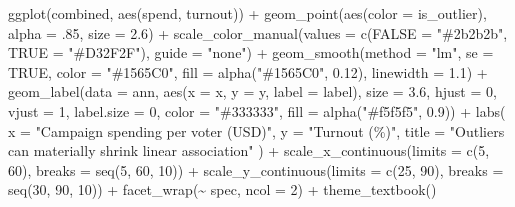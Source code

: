 \documentclass[
  letterpaper,
  DIV=11,
  numbers=noendperiod]{scrreprt}
\newenvironment{Shaded}{\begin{snugshade}}{\end{snugshade}}
\newcommand{\AttributeTok}[1]{\textcolor[rgb]{0.40,0.45,0.13}{#1}}
\newcommand{\ConstantTok}[1]{\textcolor[rgb]{0.56,0.35,0.01}{#1}}
\newcommand{\DecValTok}[1]{\textcolor[rgb]{0.68,0.00,0.00}{#1}}
\newcommand{\FloatTok}[1]{\textcolor[rgb]{0.68,0.00,0.00}{#1}}
\newcommand{\FunctionTok}[1]{\textcolor[rgb]{0.28,0.35,0.67}{#1}}
\newcommand{\NormalTok}[1]{\textcolor[rgb]{0.00,0.23,0.31}{#1}}
\newcommand{\OtherTok}[1]{\textcolor[rgb]{0.00,0.23,0.31}{#1}}
\newcommand{\SpecialCharTok}[1]{\textcolor[rgb]{0.37,0.37,0.37}{#1}}
\newcommand{\StringTok}[1]{\textcolor[rgb]{0.13,0.47,0.30}{#1}}
\begin{document}
\begin{Shaded}
\begin{Highlighting}[]
\FunctionTok{ggplot}\NormalTok{(combined, }\FunctionTok{aes}\NormalTok{(spend, turnout)) }\SpecialCharTok{+}
  \FunctionTok{geom\_point}\NormalTok{(}\FunctionTok{aes}\NormalTok{(}\AttributeTok{color =}\NormalTok{ is\_outlier), }\AttributeTok{alpha =}\NormalTok{ .}\DecValTok{85}\NormalTok{, }\AttributeTok{size =} \FloatTok{2.6}\NormalTok{) }\SpecialCharTok{+}
  \FunctionTok{scale\_color\_manual}\NormalTok{(}\AttributeTok{values =} \FunctionTok{c}\NormalTok{(}\StringTok{\textasciigrave{}}\AttributeTok{FALSE}\StringTok{\textasciigrave{}} \OtherTok{=} \StringTok{"\#2b2b2b"}\NormalTok{, }\StringTok{\textasciigrave{}}\AttributeTok{TRUE}\StringTok{\textasciigrave{}} \OtherTok{=} \StringTok{"\#D32F2F"}\NormalTok{), }\AttributeTok{guide =} \StringTok{"none"}\NormalTok{) }\SpecialCharTok{+}
  \FunctionTok{geom\_smooth}\NormalTok{(}\AttributeTok{method =} \StringTok{"lm"}\NormalTok{, }\AttributeTok{se =} \ConstantTok{TRUE}\NormalTok{, }\AttributeTok{color =} \StringTok{"\#1565C0"}\NormalTok{,}
              \AttributeTok{fill =} \FunctionTok{alpha}\NormalTok{(}\StringTok{"\#1565C0"}\NormalTok{, }\FloatTok{0.12}\NormalTok{), }\AttributeTok{linewidth =} \FloatTok{1.1}\NormalTok{) }\SpecialCharTok{+}
  \FunctionTok{geom\_label}\NormalTok{(}\AttributeTok{data =}\NormalTok{ ann, }\FunctionTok{aes}\NormalTok{(}\AttributeTok{x =}\NormalTok{ x, }\AttributeTok{y =}\NormalTok{ y, }\AttributeTok{label =}\NormalTok{ label),}
             \AttributeTok{size =} \FloatTok{3.6}\NormalTok{, }\AttributeTok{hjust =} \DecValTok{0}\NormalTok{, }\AttributeTok{vjust =} \DecValTok{1}\NormalTok{,}
             \AttributeTok{label.size =} \DecValTok{0}\NormalTok{, }\AttributeTok{color =} \StringTok{"\#333333"}\NormalTok{, }\AttributeTok{fill =} \FunctionTok{alpha}\NormalTok{(}\StringTok{"\#f5f5f5"}\NormalTok{, }\FloatTok{0.9}\NormalTok{)) }\SpecialCharTok{+}
  \FunctionTok{labs}\NormalTok{(}
    \AttributeTok{x =} \StringTok{"Campaign spending per voter (USD)"}\NormalTok{,}
    \AttributeTok{y =} \StringTok{"Turnout (\%)"}\NormalTok{,}
    \AttributeTok{title =} \StringTok{"Outliers can materially shrink linear association"}
\NormalTok{  ) }\SpecialCharTok{+}
  \FunctionTok{scale\_x\_continuous}\NormalTok{(}\AttributeTok{limits =} \FunctionTok{c}\NormalTok{(}\DecValTok{5}\NormalTok{, }\DecValTok{60}\NormalTok{), }\AttributeTok{breaks =} \FunctionTok{seq}\NormalTok{(}\DecValTok{5}\NormalTok{, }\DecValTok{60}\NormalTok{, }\DecValTok{10}\NormalTok{)) }\SpecialCharTok{+}
  \FunctionTok{scale\_y\_continuous}\NormalTok{(}\AttributeTok{limits =} \FunctionTok{c}\NormalTok{(}\DecValTok{25}\NormalTok{, }\DecValTok{90}\NormalTok{), }\AttributeTok{breaks =} \FunctionTok{seq}\NormalTok{(}\DecValTok{30}\NormalTok{, }\DecValTok{90}\NormalTok{, }\DecValTok{10}\NormalTok{)) }\SpecialCharTok{+}
  \FunctionTok{facet\_wrap}\NormalTok{(}\SpecialCharTok{\textasciitilde{}}\NormalTok{ spec, }\AttributeTok{ncol =} \DecValTok{2}\NormalTok{) }\SpecialCharTok{+}
  \FunctionTok{theme\_textbook}\NormalTok{()}
\end{Highlighting}
\end{Shaded}
\end{document}

